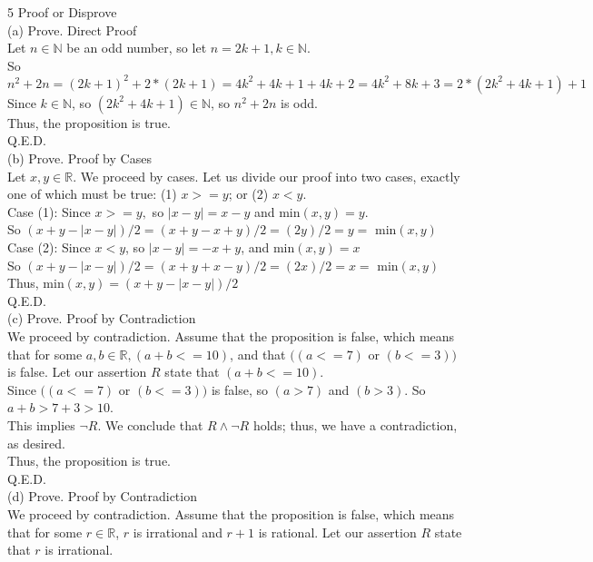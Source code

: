 \documentclass{article}
\begin{document}
{\Large 5 Proof or Disprove} \\[.3cm]
(a) Prove. Direct Proof\\[.15cm]
\indent Let $n\in\mathbb{N}$ be an odd number, so let $n = 2k + 1, k\in\mathbb{N}$.\\[.1cm]
\indent So $n^2 + 2n = (2k + 1)^2 + 2 * (2k + 1) = 4k^2 + 4k + 1 + 4k + 2 = 4k^2 + 8k + 3 = 2 * (2k^2 + 4k + 1) + 1$
\indent Since $k\in\mathbb{N}$, so $(2k^2 + 4k + 1)\in\mathbb{N}$, so $n^2 + 2n$ is odd.\\[.1cm]
\indent Thus, the proposition is true.\\[.1cm]
\indent Q.E.D.\\[.15cm]
(b) Prove. Proof by Cases\\[.15cm]
\indent Let $x, y\in\mathbb{R}$. We proceed by cases. Let us divide our proof into two cases, exactly one of which must be true: (1) $x >= y$; or (2) $x < y$.\\[.1cm]
\indent Case (1): Since $x >= y,$ so $|x - y| = x - y$ and min$(x, y) = y.$\\[.1cm]
\indent\indent So $(x + y - |x - y|)/2 = (x + y - x + y)/2 = (2y)/2 = y = $ min$(x,y)$\\[.1cm]
\indent Case (2): Since $x < y$, so $|x - y| = - x + y$, and min$(x,y) = x$\\[.1cm]
\indent\indent So $(x + y - |x - y|)/2 = (x + y + x - y)/2 = (2x)/2 = x = $ min$(x,y)$\\[.1cm]
\indent Thus, min$(x,y) = (x + y - |x - y|)/2$\\[.1cm]
\indent Q.E.D.\\[.15cm]
(c) Prove. Proof by Contradiction\\[.15cm]
\indent We proceed by contradiction. Assume that the proposition is false, which means that for some $a,b\in\mathbb{R}, (a + b <= 10)$, and that $((a <= 7)$ or $(b <= 3))$ is false. Let our assertion $R$ state that $(a + b <= 10)$.\\[.1cm]
\indent Since $((a <= 7)$ or $(b <= 3))$ is false, so $(a > 7)$ and $(b > 3)$. So $a + b > 7 + 3 > 10$.\\[.1cm]
\indent This implies $\neg R$. We conclude that $R\land\neg R$ holds; thus, we have a contradiction, as desired.\\[.1cm]
\indent Thus, the proposition is true.\\[.1cm]
\indent Q.E.D.\\[.15cm]
(d) Prove. Proof by Contradiction\\[.15cm]
\indent We proceed by contradiction. Assume that the proposition is false, which means that for some $r\in\mathbb{R}$, $r$ is irrational and $r + 1$ is rational. Let our assertion $R$ state that $r$ is irrational.
\end{document}
